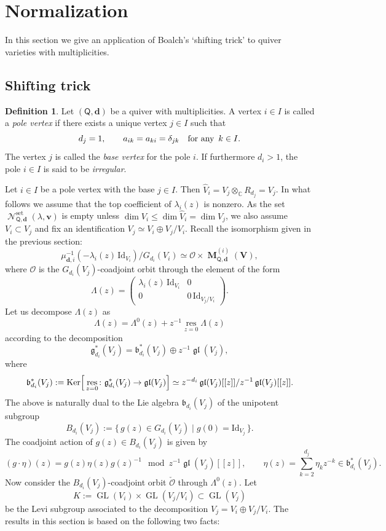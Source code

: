 \documentclass[pdftex]{sigma}
\numberwithin{equation}{section}
\theoremstyle{definition}
\newtheorem{Definition}[Theorem]{Definition}
\newcommand{\C}{\mathbb{C}} %
\newcommand{\GL}{\operatorname{GL}} %
\newcommand{\gl}{\operatorname{\mathfrak{gl}}}
\newcommand{\g}{\mathfrak{g}} %
\newcommand{\frb}{\mathfrak{b}}
\newcommand{\Ker}{\operatorname{Ker}}
\newcommand{\unit}{\mathrm{Id}}
\newcommand{\bM}{\operatorname{\mathbf{M}}}
\newcommand{\bV}{\mathbf{V}}
\newcommand{\bv}{\mathbf{v}}
\newcommand{\res}{\operatorname*{res}}
\newcommand{\ved}{\mathbf{d}}
\newcommand{\bO}{\mathcal{O}}
\newcommand{\hquad}{\hspace{.5em}}
\newcommand{\Qset}{\operatorname{\mathscr{N}}^\mathrm{set}}
\newcommand{\QQ}{\mathsf{Q}} %
\begin{document}
\section{Normalization}\label{sec:normalization}

In this section we give an application of Boalch's `shifting trick'
to quiver varieties with multiplicities.

\subsection{Shifting trick}\label{subsec:shifting}

\begin{Definition}\label{dfn:pole}
Let $(\QQ,\ved)$ be a quiver with multiplicities.
A vertex $i \in I$ is called a {\em pole vertex}
if there exists a unique vertex $j \in I$ such that
\[
d_j =1, \qquad a_{ik}=a_{ki}=\delta_{jk} \quad \text{for any}\hquad k \in I.
\]
The vertex $j$ is called the {\em base vertex} for the pole $i$.
If furthermore $d_i>1$, the pole $i \in I$ is said to be {\em irregular}.
\end{Definition}

Let $i \in I$ be a pole vertex with the base $j \in I$.
Then $\widehat{V}_i = V_j \otimes_\C R_{d_j} =V_j$.
In what follows we assume that the top coef\/f\/icient of $\lambda_i(z)$
is nonzero.
As the set
$\Qset_{\QQ,\ved}(\lambda,\bv)$ is empty unless
$\dim V_i \leq \dim \widehat{V}_i =\dim V_j$,
we also assume $V_i \subset V_j$ and f\/ix an identif\/ication
$V_j \simeq V_i \oplus V_j/V_i$.
Recall the isomorphism given in the previous section:
\[
\mu_{\ved,i}^{-1}(-\lambda_i(z)\,\unit_{V_i})/G_{d_i}(V_i) \simeq
\bO \times \bM^{(i)}_{\QQ,\ved}(\bV),
\]
where $\bO$ is the $G_{d_i}(V_j)$-coadjoint orbit
through the element of the form
\[
\Lambda(z)= \begin{pmatrix}
\lambda_i(z)\,\unit_{V_i} & 0 \\
0 & 0\,\unit_{V_j/V_i} \end{pmatrix}.
\]
Let us decompose $\Lambda(z)$ as
\[
\Lambda(z)=\Lambda^0(z) + z^{-1}\res_{z=0} \Lambda(z)
\]
according to the decomposition
\[
\g^*_{d_i}(V_j) = \frb^*_{d_i}(V_j) \oplus z^{-1} \gl(V_j),
\]
where
\[
\frb^*_{d_i}(V_j) :=
\Ker \Bigl[ \,\res_{z=0} \colon \g^*_{d_i}(V_j) \to \gl(V_j) \Bigr]
\simeq z^{-d_i}\gl(V_j)[[z]]/z^{-1}\gl(V_j)[[z]].
\]
The above is naturally
dual to the Lie algebra $\frb_{d_i}(V_j)$ of
the unipotent subgroup
\[
B_{d_i}(V_j) := \big\{\, g(z) \in G_{d_i}(V_j) \mid g(0) = \unit_{V_j}\,\big\}.
\]
The coadjoint action of $g(z) \in B_{d_i}(V_j)$ is given by
\[
(g \cdot \eta)(z) = g(z)\eta(z)g(z)^{-1} \mod z^{-1}\gl(V_j)[[z]],
\qquad \eta(z) = \sum_{k=2}^{d_j} \eta_k z^{-k} \in \frb^*_{d_i}(V_j).
\]
Now consider the $B_{d_i}(V_j)$-coadjoint orbit $\check{\bO}$
through $\Lambda^0(z)$. Let
\[
K:=\GL(V_i) \times \GL(V_j/V_i) \subset \GL(V_j)
\]
be the Levi subgroup associated to the decomposition
$V_j = V_i \oplus V_j/V_i$.
The results in this section is based on the following two facts:
\end{document}
